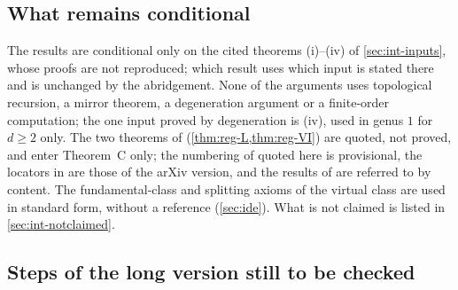 \subsection*{What remains conditional}

The results are conditional only on the cited theorems (i)--(iv) of \cref{sec:int-inputs}, whose proofs are not reproduced; which result uses which input is stated there and is unchanged by the abridgement. None of the arguments uses topological recursion, a mirror theorem, a degeneration argument or a finite-order computation; the one input proved by degeneration is (iv), used in genus $1$ for $d\geq2$ only. The two theorems of \cite{LP2} (\cref{thm:reg-L,thm:reg-VI}) are quoted, not proved, and enter Theorem~C only; the numbering of \cite{LP2} quoted here is provisional, the locators in \cite{Tel12} are those of the arXiv version, and the results of \cite{BS} are referred to by content. The fundamental-class and splitting axioms of the virtual class are used in standard form, without a reference (\cref{sec:ide}). What is not claimed is listed in \cref{sec:int-notclaimed}.

\subsection*{Steps of the long version still to be checked}

